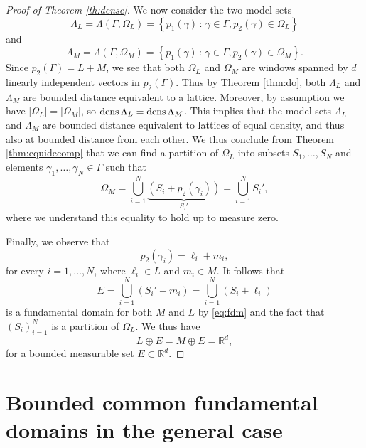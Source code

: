 \documentclass[12pt,a4paper,oneside]{amsart}
\theoremstyle{plain}
\theoremstyle{definition}
\newcommand{\RR}{{\mathbb R}}
\newcommand{\dens}{{\rm dens\,}}
\newcounter{rem}
\begin{document}
\begin{proof}[Proof of Theorem \ref{th:dense}]
We now consider the two model sets 
\begin{equation*}
\Lambda_L= \Lambda(\Gamma, \Omega_L) = \left\{ p_1(\gamma) \, : \, \gamma \in \Gamma , p_2(\gamma) \in \Omega_L \right\}
\end{equation*}
and
\begin{equation*}
\Lambda_M = \Lambda(\Gamma, \Omega_M) = \left\{ p_1(\gamma) \, : \, \gamma \in \Gamma , p_2(\gamma) \in \Omega_M \right\}.
\end{equation*}
Since $p_2(\Gamma) = L + M$, we see that both $\Omega_L$ and $\Omega_M$ are windows spanned by $d$ linearly independent vectors in $p_2(\Gamma)$. Thus by Theorem \ref{thm:do}, both $\Lambda_L$ and $\Lambda_M$ are bounded distance equivalent to a lattice. Moreover, by assumption we have $|\Omega_L|=|\Omega_M|$, so $\dens \Lambda_L= \dens \Lambda_M$. This implies that the model sets $\Lambda_L$ and $\Lambda_M$ are bounded distance equivalent to lattices of equal density, and thus also {at bounded distance from each other}. We thus conclude from Theorem \ref{thm:equidecomp} that we can find a partition of $\Omega_L$ into subsets $S_1, \ldots , S_N$ and elements $\gamma_1 , \ldots , \gamma_N \in \Gamma$ such that 
\begin{equation}\label{eq:fdm}
\Omega_M = \bigcup_{i=1}^N \underbrace{\left(S_i + p_2(\gamma_i) \right)}_{S_i'} = \bigcup_{i=1}^N S_i',
\end{equation}
where we understand this equality to hold up to measure zero.

Finally, we observe that 
\begin{equation*}
p_2(\gamma_i) = \ell_i + m_i, 
\end{equation*}
for every $i=1, \ldots , N$, where $\ell_i \in L$ and $m_i \in M$. It follows that
\begin{equation*}
E=\bigcup_{i=1}^N (S_i' - m_i) = \bigcup_{i=1}^N (S_i + \ell_i)
\end{equation*}
is a fundamental domain for both $M$ and $L$ by \eqref{eq:fdm} and the fact that $(S_i)_{i=1}^N$ is a partition of $\Omega_L$. We thus have
\begin{equation*}
L \oplus E = M \oplus E = \mathbb{R}^d,
\end{equation*}
for a bounded measurable set $E \subset \RR^d$.
\end{proof}

\section{Bounded common fundamental domains in the general case}\label{s:general}
\end{document}
